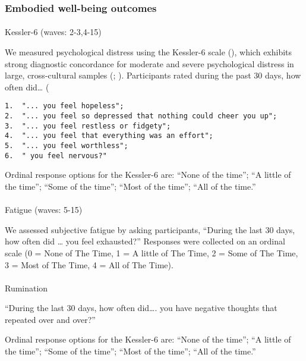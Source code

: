 \documentclass[
  singlecolumn,
  9pt]{article}
\makeatletter
\let\oldparagraph\paragraph
\renewcommand{\paragraph}{
    \@ifstar
      \xxxParagraphStar
      \xxxParagraphNoStar
  }
\newcommand{\xxxParagraphStar}[1]{\oldparagraph*{#1}\mbox{}}
\newcommand{\xxxParagraphNoStar}[1]{\oldparagraph{#1}\mbox{}}
\makeatother
\begin{document}
\subsubsection{Embodied well-being
outcomes}\label{embodied-well-being-outcomes}

\paragraph{Kessler-6 (waves: 2-3,4-15)}\label{kessler-6-waves-2-34-15}

We measured psychological distress using the Kessler-6 scale
(), which exhibits
strong diagnostic concordance for moderate and severe psychological
distress in large, cross-cultural samples
(;
).
Participants rated during the past 30 days, how often did\ldots{} (

\begin{verbatim}
1.  "... you feel hopeless";
2.  "... you feel so depressed that nothing could cheer you up";
3.  "... you feel restless or fidgety";
4.  "... you feel that everything was an effort";
5.  "... you feel worthless";
6.  " you feel nervous?"
\end{verbatim}

Ordinal response options for the Kessler-6 are: ``None of the time'';
``A little of the time''; ``Some of the time''; ``Most of the time'';
``All of the time.''

\paragraph{Fatigue (waves: 5-15)}\label{fatigue-waves-5-15}

We assessed subjective fatigue by asking participants, ``During the last
30 days, how often did \ldots{} you feel exhausted?'' Responses were
collected on an ordinal scale (0 = None of The Time, 1 = A little of The
Time, 2 = Some of The Time, 3 = Most of The Time, 4 = All of The Time).

\paragraph{Rumination}\label{rumination}

``During the last 30 days, how often did\ldots. you have negative
thoughts that repeated over and over?''

Ordinal response options for the Kessler-6 are: ``None of the time'';
``A little of the time''; ``Some of the time''; ``Most of the time'';
``All of the time.''
\end{document}
